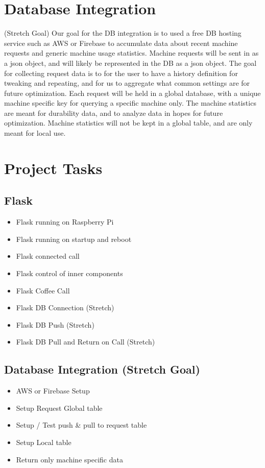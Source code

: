 \documentclass[conference]{IEEEtran}
\begin{document}
\section{Database Integration}
(Stretch Goal) Our goal for the DB integration is to used a free DB hosting service such as AWS or Firebase
to accumulate data about recent machine requests and generic machine usage statistics. Machine requests will
be sent in as a json object, and will likely be represented in the DB as a json object. The goal for collecting request
data is to for the user to have a history definition for tweaking and repeating, and for us to aggregate what common 
settings are for future optimization. Each request will be held in a global database, with a unique machine specific
key for querying a specific machine only. The machine statistics are meant for durability data, and to analyze data in hopes for future optimization.
Machine statistics will not be kept in a global table, and are only meant for local use.

\section{Project Tasks}
\subsection{Flask}
\begin{itemize}
\item Flask running on Raspberry Pi
\item Flask running on startup and reboot
\item Flask connected call
\item Flask control of inner components
\item Flask Coffee Call
\item Flask DB Connection (Stretch)
\item Flask DB Push (Stretch)
\item Flask DB Pull and Return on Call (Stretch)
\end{itemize}
\subsection{Database Integration (Stretch Goal)}
\begin{itemize}
\item AWS or Firebase Setup
\item Setup Request Global table
\item Setup / Test push \& pull to request table
\item Setup Local table
\item Return only machine specific data
\end{itemize}
\end{document}
